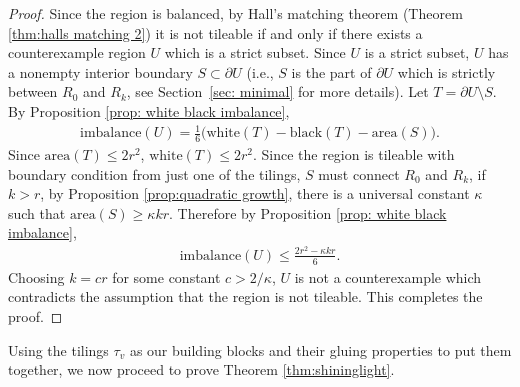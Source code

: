 \documentclass[11pt]{article}
\theoremstyle{remark}
\theoremstyle{definition}
\begin{document}
\begin{proof}
    Since the region is balanced, by Hall's matching theorem (Theorem \ref{thm:halls matching 2}) it is not tileable if and only if there exists a counterexample region $U$ which is a strict subset. Since $U$ is a strict subset, $U$ has a nonempty interior boundary $S\subset \partial U$ (i.e., $S$ is the part of $\partial U$ which is strictly between $R_0$ and $R_k$, see Section~\ref{sec: minimal} for more details). Let $T =\partial U\setminus S$. By Proposition \ref{prop: white black imbalance},
    \begin{align*}
        \text{imbalance}(U) = \frac{1}{6}\bigg(\text{white}(T) -\text{black}(T) - \text{area}(S)\bigg). 
    \end{align*}
    Since $\text{area}(T)\leq 2r^2$, $\text{white}(T)\leq 2r^2$. Since the region is tileable with boundary condition from just one of the tilings, $S$ must connect $R_0$ and $R_k$, if $k> r$, by Proposition \ref{prop:quadratic growth}, there is a universal constant $\kappa$ such that $\text{area}(S)\geq \kappa k r$. Therefore by Proposition \ref{prop: white black imbalance},
    \begin{align*}
        \text{imbalance}(U) \leq \frac{2r^2 - \kappa k r}{6}.
    \end{align*}
    Choosing $k= cr$ for some constant $c>2/\kappa$, $U$ is not a counterexample which contradicts the assumption that the region is not tileable. This completes the proof. 
\end{proof}

Using the tilings $\tau_v$ as our building blocks and their gluing properties to put them together, we now proceed to prove Theorem \ref{thm:shininglight}.
\end{document}

